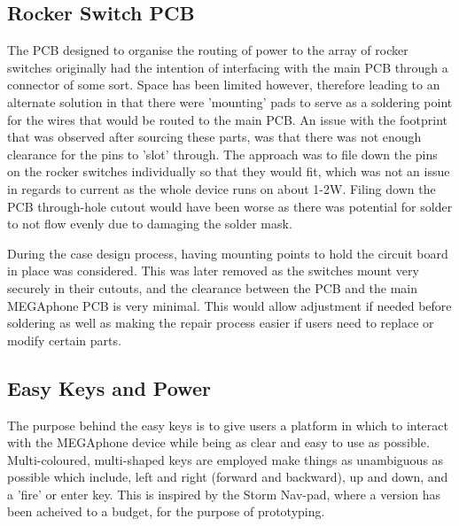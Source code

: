 
\subsection{Rocker Switch PCB}

The PCB designed to organise the routing of power to the array of rocker switches originally had the intention of interfacing with the main PCB through a connector of some sort.
Space has been limited however, therefore leading to an alternate solution in that there were 'mounting' pads to serve as a soldering point for the wires that would be routed to the main PCB.
An issue with the footprint that was observed after sourcing these parts, was that there was not enough clearance for the pins to 'slot' through.
The approach was to file down the pins on the rocker switches individually so that they would fit, which was not an issue in regards to current as the whole device runs on about 1-2W.
Filing down the PCB through-hole cutout would have been worse as there was potential for solder to not flow evenly due to damaging the solder mask. %

During the case design process, having mounting points to hold the circuit board in place was considered.
This was later removed as the switches mount very securely in their cutouts, and the clearance between the PCB and the main MEGAphone PCB is very minimal.
This would allow adjustment if needed before soldering as well as making the repair process easier if users need to replace or modify certain parts.


\subsection{Easy Keys and Power}

The purpose behind the easy keys is to give users a platform in which to interact with the MEGAphone device while being as clear and easy to use as possible.
Multi-coloured, multi-shaped keys are employed make things as unambiguous as possible which include, left and right (forward and backward), up and down, and a 'fire' or enter key.
This is inspired by the Storm Nav-pad, where a version has been acheived to a budget, for the purpose of prototyping.

